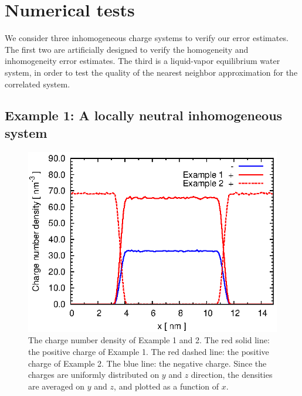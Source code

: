 \documentclass[aps,pre,preprint,unsortedaddress]{revtex4}
\begin{document}
\section{Numerical tests}\label{sec:tmp3}

We consider three inhomogeneous charge systems to verify our error
estimates.
The first two are artificially designed to verify the 
homogeneity and inhomogeneity error estimates. The third is a 
liquid-vapor equilibrium water system, in order to test the
quality  of the nearest neighbor approximation for the correlated system.  


\subsection{Example 1: A locally neutral inhomogeneous system}
\label{sec:example1}

\begin{figure}
  \centering
  \includegraphics[]{fig.rho.eps}
  \caption{
    The charge number density  of Example 1 and 2.
    The red solid line: the positive charge of Example 1.
    The red dashed line: the positive charge of Example 2.
    The blue line: the negative charge.
    Since the charges are uniformly distributed
    on $y$ and $z$ direction, the densities are averaged on $y$ and $z$,
    and plotted as a
    function of $x$.
  }
  \label{fig:tmp-rho}
\end{figure}
\end{document}
